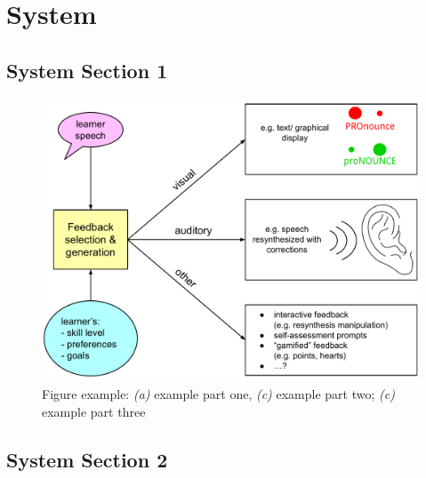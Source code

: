 %
\chapter{System}
\label{sec:system}


\Blindtext[2][1]

\section{System Section 1}
\label{sec:system:sec1}

\Blindtext[1][2]

\begin{figure}[htb]
	\includegraphics[width=\textwidth]{../img/feedback}
	\caption{Figure example: \textit{(a)} example part one, \textit{(c)} example part two; \textit{(c)} example part three}
	\label{fig:system:example1}
\end{figure}

\Blindtext[1][2]

\section{System Section 2}
\label{sec:system:sec2}

\Blindtext[1][2]

